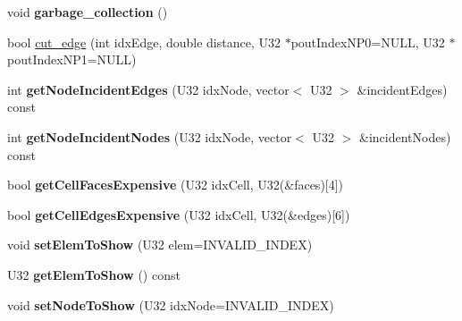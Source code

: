 \begin{DoxyCompactItemize}
\item 
\hypertarget{classps_1_1elastic_1_1VolMesh_a9c540723cbf4c7bea9af0f45ab84ee68}{}void {\bfseries garbage\+\_\+collection} ()\label{classps_1_1elastic_1_1VolMesh_a9c540723cbf4c7bea9af0f45ab84ee68}

\item 
bool \hyperlink{classps_1_1elastic_1_1VolMesh_a842ed44f9368421b32524b057cee2b58}{cut\+\_\+edge} (int idx\+Edge, double distance, U32 $\ast$pout\+Index\+N\+P0=N\+U\+L\+L, U32 $\ast$pout\+Index\+N\+P1=N\+U\+L\+L)
\item 
\hypertarget{classps_1_1elastic_1_1VolMesh_a9f2ddb6b25e1b608fb7ff37dbcf71009}{}int {\bfseries get\+Node\+Incident\+Edges} (U32 idx\+Node, vector$<$ U32 $>$ \&incident\+Edges) const \label{classps_1_1elastic_1_1VolMesh_a9f2ddb6b25e1b608fb7ff37dbcf71009}

\item 
\hypertarget{classps_1_1elastic_1_1VolMesh_a3bbd2d1170bca105b0bed88d4023e795}{}int {\bfseries get\+Node\+Incident\+Nodes} (U32 idx\+Node, vector$<$ U32 $>$ \&incident\+Nodes) const \label{classps_1_1elastic_1_1VolMesh_a3bbd2d1170bca105b0bed88d4023e795}

\item 
\hypertarget{classps_1_1elastic_1_1VolMesh_a1c77dd15d2adc50e1c63507e7369880f}{}bool {\bfseries get\+Cell\+Faces\+Expensive} (U32 idx\+Cell, U32(\&faces)\mbox{[}4\mbox{]})\label{classps_1_1elastic_1_1VolMesh_a1c77dd15d2adc50e1c63507e7369880f}

\item 
\hypertarget{classps_1_1elastic_1_1VolMesh_a656608a0c79e22cc0735d0060e0da3e1}{}bool {\bfseries get\+Cell\+Edges\+Expensive} (U32 idx\+Cell, U32(\&edges)\mbox{[}6\mbox{]})\label{classps_1_1elastic_1_1VolMesh_a656608a0c79e22cc0735d0060e0da3e1}

\item 
\hypertarget{classps_1_1elastic_1_1VolMesh_a3f90d8aaf6d2a78dc795c64e14f5f251}{}void {\bfseries set\+Elem\+To\+Show} (U32 elem=I\+N\+V\+A\+L\+I\+D\+\_\+\+I\+N\+D\+E\+X)\label{classps_1_1elastic_1_1VolMesh_a3f90d8aaf6d2a78dc795c64e14f5f251}

\item 
\hypertarget{classps_1_1elastic_1_1VolMesh_a6afa5a0a0d179a42bd92b7fc6abfd4c1}{}U32 {\bfseries get\+Elem\+To\+Show} () const \label{classps_1_1elastic_1_1VolMesh_a6afa5a0a0d179a42bd92b7fc6abfd4c1}

\item 
\hypertarget{classps_1_1elastic_1_1VolMesh_ae423b20d80615e4c48b14133ac06b4c7}{}void {\bfseries set\+Node\+To\+Show} (U32 idx\+Node=I\+N\+V\+A\+L\+I\+D\+\_\+\+I\+N\+D\+E\+X)\label{classps_1_1elastic_1_1VolMesh_ae423b20d80615e4c48b14133ac06b4c7}


\end{DoxyCompactItemize}
